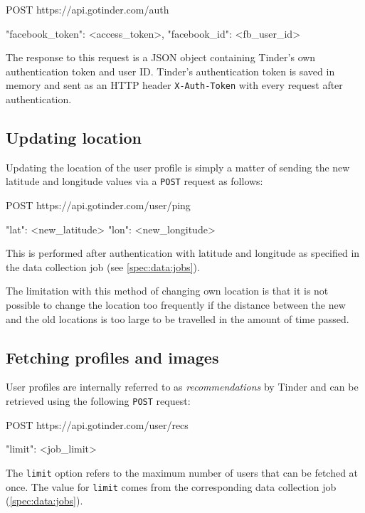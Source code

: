 \begin{logs}
POST https://api.gotinder.com/auth

{
    "facebook_token": <access_token>, 
    "facebook_id": <fb_user_id>
}
\end{logs}

The response to this request is a JSON object containing Tinder's own 
authentication token and user ID. Tinder's authentication token is saved in 
memory and sent as an HTTP header \texttt{X-Auth-Token} with every request 
after authentication.


\subsection{Updating location}
Updating the location of the user profile is simply a matter of sending the 
new latitude and longitude values via a \texttt{POST} request as follows:
\begin{logs}
POST https://api.gotinder.com/user/ping

{
    "lat": <new_latitude>
    "lon": <new_longitude>
}
\end{logs}
This is performed after authentication with latitude and longitude as 
specified in the data collection job (see \ref{spec:data:jobs}).

The limitation with this method of changing own location is that it is not 
possible to change the location too frequently if the distance between the new 
and the old locations is too large to be travelled in the amount of time 
passed.

\subsection{Fetching profiles and images}
User profiles are internally referred to as \textit{recommendations} by Tinder and 
can be retrieved using the following \texttt{POST} request:
\begin{logs}
POST https://api.gotinder.com/user/recs

{
    "limit": <job_limit>
}
\end{logs}
The \texttt{limit} option refers to the maximum number of users that can be 
fetched at once. The value for \texttt{limit} comes from the corresponding 
data collection job (\ref{spec:data:jobs}).

